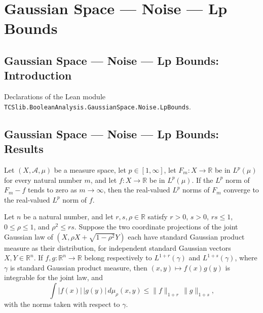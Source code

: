 \section{Gaussian Space --- Noise --- Lp Bounds}
\subsection*{Gaussian Space --- Noise --- Lp Bounds: Introduction}

Declarations of the Lean module \texttt{TCSlib.BooleanAnalysis.GaussianSpace.Noise.LpBounds}.

\subsection*{Gaussian Space --- Noise --- Lp Bounds: Results}

\begin{lemma}
\label{BooleanAnalysis.GaussianSpace.tendsto_toReal_eLpNorm_of_sub}
\leanok
{}
Let $(X,\mathcal A,\mu)$ be a measure space, let $p\in[1,\infty]$, let $F_m:X\to\mathbb
R$ be in $L^p(\mu)$ for every natural number $m$, and let $f:X\to\mathbb R$ be in
$L^p(\mu)$. If the $L^p$ norm of $F_m-f$ tends to zero as $m\to\infty$, then the
real-valued $L^p$ norms of $F_m$ converge to the real-valued $L^p$ norm of $f$.
\end{lemma}

\begin{lemma}
\label{BooleanAnalysis.GaussianSpace.gaussian_two_function_positiveOffsets}
\leanok
{}
Let $n$ be a natural number, and let $r,s,\rho\in\mathbb R$ satisfy $r>0$, $s>0$,
$rs\le1$, $0\le\rho\le1$, and $\rho^2\le rs$. Suppose the two coordinate projections of
the joint Gaussian law of $(X,\rho X+\sqrt{1-\rho^2}Y)$ each have standard Gaussian
product measure as their distribution, for independent standard Gaussian vectors
$X,Y\in\mathbb R^n$. If $f,g:\mathbb R^n\to\mathbb R$ belong respectively to
$L^{1+r}(\gamma)$ and $L^{1+s}(\gamma)$, where $\gamma$ is standard Gaussian product
measure, then $(x,y)\mapsto f(x)g(y)$ is integrable for the joint law, and
\[
\int |f(x)|\,|g(y)|\,d\mu_\rho(x,y)\le \|f\|_{1+r}\,\|g\|_{1+s},
\]
with the norms taken with respect to $\gamma$.
\end{lemma}
